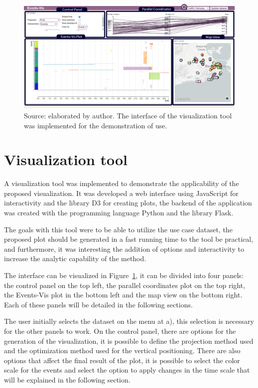 \begin{figure}
    \centering
    \includegraphics[width = \linewidth]{src/imgs/visualization-tool.pdf}
    \caption{Source: elaborated by author. The interface of the visualization tool was implemented for the demonstration of use.}
    \label{fig:visualization-tool}
\end{figure}

\section{Visualization tool}
\label{sec:visualization-tool}
A visualization tool was implemented to demonstrate the applicability of the proposed visualization.
%
It was developed a web interface using JavaScript for interactivity and the library D3 for creating plots, the backend of the application was created with the programming language Python and the library Flask.
%

The goals with this tool were to be able to utilize the use case dataset, the proposed plot should be generated in a fast running time to the tool be practical,
%
and furthermore, it was interesting the addition of options and interactivity to increase the analytic capability of the method.

The interface can be visualized in Figure~\ref{fig:visualization-tool}, it can be divided into four panels: the control panel on the top left, the parallel coordinates plot on the top right, the Events-Vis plot in the bottom left and the map view on the bottom right.
%
Each of these panels will be detailed in the following sections.

The user initially selects the dataset on the menu at a), this selection is necessary for the other panels to work.
%
On the control panel, there are options for the generation of the visualization,
%
it is possible to define the projection method used and the optimization method used for the vertical positioning.
%
There are also options that affect the final result of the plot, it is possible to select the color scale for the events and select the option to apply changes in the time scale that will be explained in the following section.

